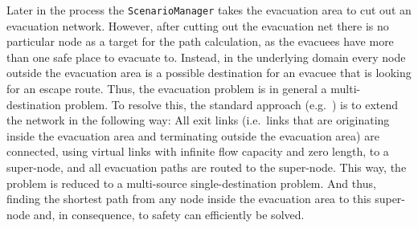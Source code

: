 Later in the process the \verb+ScenarioManager+ takes the evacuation area to cut out an evacuation network. However, after cutting out the evacuation net there is no particular node as a target for the path
calculation, as the evacuees have more than one safe place to evacuate to. Instead,
in the underlying domain every node outside the evacuation area is a possible
destination for an evacuee that is looking for an escape route. Thus, the evacuation problem is in general a multi-destination problem. To resolve this,
the standard approach (e.g.~\citet{FordFulkerson1962FlowsInNetworks,LuGeorgeEtAl2005CapacityConstrainedRouting})
is to extend the network in the following way: All exit links (i.e.\ links that are originating inside the evacuation area and terminating outside the evacuation area) are connected, using virtual links with infinite flow capacity
and zero length, to a super-node, and all evacuation paths are routed to the super-node. This way, the problem is reduced to a multi-source single-destination problem. And thus, finding the shortest path from any node inside the evacuation area to this super-node and, in consequence, to safety can efficiently be solved.


